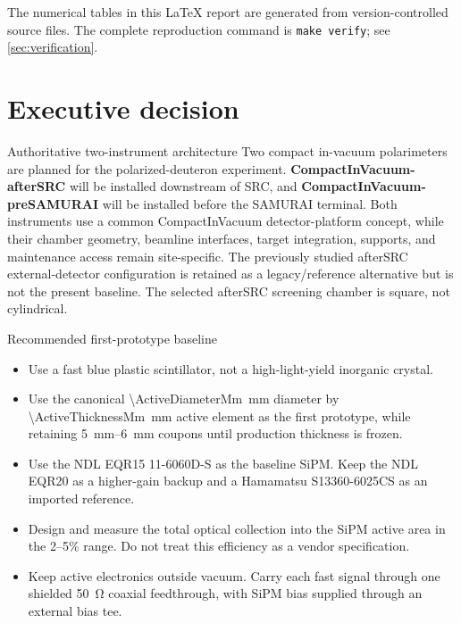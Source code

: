 \documentclass[10pt,letterpaper]{article}
\begin{document}
\begin{titlepage}
  \vspace{0.22in}
  {\small\color{ReportMuted}
  The numerical tables in this LaTeX report are generated from version-controlled source files.
  The complete reproduction command is \texttt{make verify}; see \cref{sec:verification}.}
\end{titlepage}

\hypersetup{pageanchor=true}
\tableofcontents
\clearpage
{}

\section{Executive decision}

\begin{decisionbox}{Authoritative two-instrument architecture}
  Two compact in-vacuum polarimeters are planned for the polarized-deuteron experiment.
  \textbf{CompactInVacuum-afterSRC} will be installed downstream of SRC, and
  \textbf{CompactInVacuum-preSAMURAI} will be installed before the SAMURAI terminal.
  Both instruments use a common CompactInVacuum detector-platform concept, while their
  chamber geometry, beamline interfaces, target integration, supports, and maintenance
  access remain site-specific. The previously studied afterSRC external-detector
  configuration is retained as a legacy/reference alternative but is not the present
  baseline. The selected afterSRC screening chamber is square, not cylindrical.
\end{decisionbox}

\begin{decisionbox}{Recommended first-prototype baseline}
  \begin{itemize}
    \item Use a fast blue plastic scintillator, not a high-light-yield inorganic crystal.
    \item Use the canonical \SI{\ActiveDiameterMm}{\milli\meter} diameter by
      \SI{\ActiveThicknessMm}{\milli\meter} active element as the first prototype, while
      retaining \SIrange{5}{6}{\milli\meter} coupons until production thickness is frozen.
    \item Use the NDL EQR15 11-6060D-S as the baseline SiPM. Keep the NDL EQR20 as a
      higher-gain backup and a Hamamatsu S13360-6025CS as an imported reference.
    \item Design and measure the total optical collection into the SiPM active area in the
      2--5\% range. Do not treat this efficiency as a vendor specification.
    \item Keep active electronics outside vacuum. Carry each fast signal through one shielded
      \SI{50}{\ohm} coaxial feedthrough, with SiPM bias supplied through an external bias tee.
  \end{itemize}
\end{decisionbox}
\end{document}
